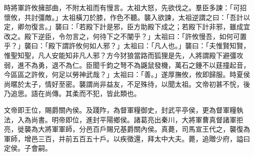 \begin{pinyinscope}
 
 
 
 時將軍許攸擁部曲，不附太祖而有慢言。太祖大怒，先欲伐之。羣臣多諫：「可招懷攸，共討彊敵。」太祖橫刀於膝，作色不聽。襲入欲諫，太祖逆謂之曰：「吾計以定，卿勿復言。」襲曰：「若殿下計是邪，臣方助殿下成之；若殿下計非邪，雖成宜改之。殿下逆臣，令勿言之，何待下之不闡乎？」太祖曰：「許攸慢吾，如何可置乎？」襲曰：「殿下謂許攸何如人邪？」太祖曰：「凡人也。」襲曰：「夫惟賢知賢，惟聖知聖，凡人安能知非凡人邪？方今犲狼當路而狐狸是先，人將謂殿下避彊攻弱，進不為勇，退不為仁。臣聞千鈞之弩不為鼷鼠發機，萬石之鍾不以莛撞起音，今區區之許攸，何足以勞神武哉？」太祖曰：「善。」遂厚撫攸，攸即歸服。時夏侯尚暱於太子，情好至密。襲謂尚非益友，不足殊待，以聞太祖。文帝初甚不恱，後乃追思。語在尚傳。其柔而不犯，皆此類也。
 
 
 
 
 文帝即王位，賜爵關內侯。及踐阼，為督軍糧御史，封武平亭侯，更為督軍糧執法，入為尚書。明帝即位，進封平陽鄉侯。諸葛亮出秦川，大將軍曹真督諸軍拒亮，徙襲為大將軍軍師，分邑百戶賜兄基爵關內侯。真薨，司馬宣王代之，襲復為軍師，增邑三百，并前五百五十戶。以疾徵還，拜太中大夫。薨，追贈少府，謚曰定侯。子會嗣。
 
 
\end{pinyinscope}